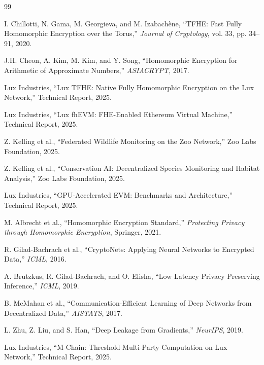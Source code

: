 \documentclass[11pt,letterpaper]{article}
\begin{document}

\begin{thebibliography}{99}

I. Chillotti, N. Gama, M. Georgieva, and M. Izabach\`{e}ne, ``TFHE: Fast Fully Homomorphic Encryption over the Torus,'' \textit{Journal of Cryptology}, vol. 33, pp. 34--91, 2020.

J.H. Cheon, A. Kim, M. Kim, and Y. Song, ``Homomorphic Encryption for Arithmetic of Approximate Numbers,'' \textit{ASIACRYPT}, 2017.

Lux Industries, ``Lux TFHE: Native Fully Homomorphic Encryption on the Lux Network,'' Technical Report, 2025.

Lux Industries, ``Lux fhEVM: FHE-Enabled Ethereum Virtual Machine,'' Technical Report, 2025.

Z. Kelling et al., ``Federated Wildlife Monitoring on the Zoo Network,'' Zoo Labs Foundation, 2025.

Z. Kelling et al., ``Conservation AI: Decentralized Species Monitoring and Habitat Analysis,'' Zoo Labs Foundation, 2025.

Lux Industries, ``GPU-Accelerated EVM: Benchmarks and Architecture,'' Technical Report, 2025.

M. Albrecht et al., ``Homomorphic Encryption Standard,'' \textit{Protecting Privacy through Homomorphic Encryption}, Springer, 2021.

R. Gilad-Bachrach et al., ``CryptoNets: Applying Neural Networks to Encrypted Data,'' \textit{ICML}, 2016.

A. Brutzkus, R. Gilad-Bachrach, and O. Elisha, ``Low Latency Privacy Preserving Inference,'' \textit{ICML}, 2019.

B. McMahan et al., ``Communication-Efficient Learning of Deep Networks from Decentralized Data,'' \textit{AISTATS}, 2017.

L. Zhu, Z. Liu, and S. Han, ``Deep Leakage from Gradients,'' \textit{NeurIPS}, 2019.

Lux Industries, ``M-Chain: Threshold Multi-Party Computation on Lux Network,'' Technical Report, 2025.

\end{thebibliography}
\end{document}
